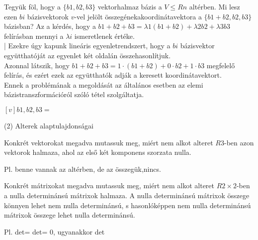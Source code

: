 \begin{frame}
  \begin{tcolorbox}[title={1/4. -Q-}]
      Tegyük föl, hogy a $\{b1,b2,b3\}$ vektorhalmaz bázis a $V ≤ Rn$ altérben. Mi lesz ezen $bi$ bázisvektorok $v$-vel jelölt összegénekakoordinátavektora a $\{b1+b2,b2,b3\}$ bázisban?
  \tcblower
    Az a kérdés, hogy a $b1+b2+b3 = λ1(b1+b2)+λ2b2+λ3b3$ felírásban mennyi a $λi$ ismeretlenek értéke.\\|
      Ezekre úgy kapunk lineáris egyenletrendszert, hogy a $bi$ bázisvektor együtthatóját az egyenlet két oldalán összehasonlítjuk.\\
      
      Azonnal látszik, hogy $b1 + b2 + b3 = 1·(b1 + b2) + 0·b2 + 1·b3$ megfelelő felírás, és ezért ezek az együtthatók adják a keresett koordinátavektort.\\
      
      Ennek a problémának a megoldását az általános esetben az elemi bázistranszformációról szóló tétel szolgáltatja.
      
   $[v]b1,b2,b3 =$ 
  \end{tcolorbox}
\end{frame}  

\begin{frame}[plain]
\begin{tcolorbox}[center, colback={myyellow}, coltext={black}, colframe={myyellow}]
    {\RHuge  (2) Alterek alaptulajdonságai}
    \mmedskip
\end{tcolorbox}
\end{frame}

\begin{frame}
  \begin{tcolorbox}[title={2/1. -R-}]
      Konkrét vektorokat megadva mutassuk meg, miért nem alkot alteret $R3$-ben azon vektorok halmaza, ahol az első két komponens szorzata nulla. 
  \tcblower

    \mmedskip 
  
   Pl. benne vannak az altérben, de az összegük,nincs.
  \end{tcolorbox}
\end{frame}


\begin{frame}
  \begin{tcolorbox}[title={2/2. -Q-}]
      Konkrét mátrixokat megadva mutassuk meg, miért nem alkot alteret $R2×2$-ben a nulla determinánsú mátrixok halmaza. 
  \tcblower
    A nulla determinánsú mátrixok összege könnyen lehet nem nulla determinánsú, s hasonlóképpen nem nulla determinánsú mátrixok összege lehet nulla determinánsú.\\
    \mmedskip 
  
    Pl. det= det= 0, ugyanakkor det
  \end{tcolorbox}
\end{frame}

